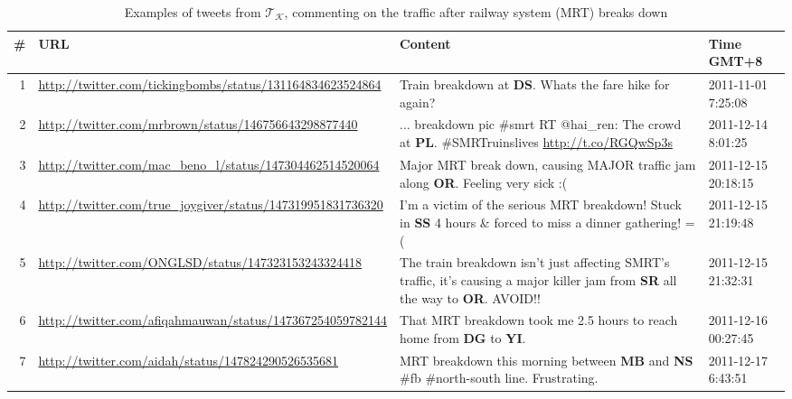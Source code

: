 \documentclass[conference]{IEEEtran.1.8}
\begin{document}
\begin{table}[htb]
	\centering
	\caption{Examples of tweets from $\mathcal{T}_{\mathcal{K}}$, commenting on the traffic after railway system (MRT) breaks down}
	\label{tbl:tweets}
	\begin{tabular}{|r|p{4cm}|p{9.5cm}|p{2.1cm}|}
		\hline
		\# & URL & Content & Time GMT+8 \\
		\hline
		1 & \url{http://twitter.com/tickingbombs/status/131164834623524864} & Train breakdown at \textbf{DS}. Whats the fare hike for again? & 2011-11-01 7:25:08  \\
		\hline
		2 & \url{http://twitter.com/mrbrown/status/146756643298877440} & ... breakdown pic \#smrt RT @hai\_ren: The crowd at \textbf{PL}. \#SMRTruinslives \url{http://t.co/RGQwSp3s} & 2011-12-14 8:01:25 \\
		\hline
		3 & \url{http://twitter.com/mac_beno_l/status/147304462514520064} & Major MRT break down, causing MAJOR traffic jam along \textbf{OR}. Feeling very sick :( & 2011-12-15 20:18:15 \\
		\hline
		4 & \url{http://twitter.com/true_joygiver/status/147319951831736320} & I'm a victim of the serious MRT breakdown! Stuck in \textbf{SS} 4 hours \& forced to miss a dinner gathering! =( & 2011-12-15 21:19:48 \\
		\hline
		5 & \url{http://twitter.com/ONGLSD/status/147323153243324418} & The train breakdown isn't just affecting SMRT's traffic, it's causing a major killer jam from \textbf{SR} all the way to \textbf{OR}. AVOID!! & 2011-12-15 21:32:31 \\
		\hline
		6 & \url{http://twitter.com/afiqahmauwan/status/147367254059782144}	& That MRT breakdown took me 2.5 hours to reach home from \textbf{DG} to \textbf{YI}. & 2011-12-16 00:27:45 \\
		\hline
		7 & \url{http://twitter.com/aidah/status/147824290526535681} & MRT breakdown this morning between \textbf{MB} and \textbf{NS} \#fb \#north-south line. Frustrating. & 2011-12-17 6:43:51 \\
		\hline
	\end{tabular}
\end{table}
\end{document}
